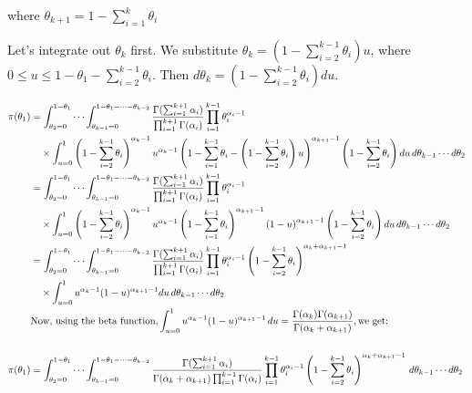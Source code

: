 \documentclass[a4paper]{article}
\begin{document}
where \(\theta_{k+1} = 1 - \sum_{i=1}^{k}\theta_i\)

Let's integrate out \(\theta_k\) first. We substitute \(\theta_k = (1 - \sum_{i=2}^{k-1} \theta_i)u\), where \(0 \leq u \leq 1 - \theta_1 - \sum_{i=2}^{k-1} \theta_i\). Then \(d\theta_k = (1 - \sum_{i=2}^{k-1} \theta_i) du\).

\begin{align*}
    \pi(\theta_1) &= \int_{\theta_2=0}^{1-\theta_1} \cdots \int_{\theta_{k-1}=0}^{1-\theta_1-\cdots-\theta_{k-2}} \frac{\Gamma(\sum_{i=1}^{k+1} \alpha_i)}{\prod_{i=1}^{k+1} \Gamma(\alpha_i)} \prod_{i=1}^{k-1} \theta_i^{\alpha_i - 1} \\
    & \quad \times \int_{u=0}^{1} \left(1 - \sum_{i=2}^{k-1} \theta_i \right)^{\alpha_k - 1} u^{\alpha_k - 1} \left(1 - \sum_{i=1}^{k-1} \theta_i - \left(1 - \sum_{i=2}^{k-1} \theta_i\right)u \right)^{\alpha_{k+1} - 1} \left(1 - \sum_{i=2}^{k-1} \theta_i \right) du\, d\theta_{k-1}\cdots d\theta_2 \\
    &= \int_{\theta_2=0}^{1-\theta_1} \cdots \int_{\theta_{k-1}=0}^{1-\theta_1-\cdots-\theta_{k-2}} \frac{\Gamma(\sum_{i=1}^{k+1} \alpha_i)}{\prod_{i=1}^{k+1} \Gamma(\alpha_i)} \prod_{i=1}^{k-1} \theta_i^{\alpha_i - 1} \\
    & \quad \times \int_{u=0}^{1} \left(1 - \sum_{i=2}^{k-1} \theta_i \right)^{\alpha_k - 1} u^{\alpha_k - 1} \left(1 - \sum_{i=1}^{k-1}\theta_i\right)^{\alpha_{k+1}-1}\left(1 - u\right)^{\alpha_{k+1} - 1} \left(1 - \sum_{i=2}^{k-1} \theta_i \right) du\, d\theta_{k-1}\cdots d\theta_2 \\
    &= \int_{\theta_2=0}^{1-\theta_1} \cdots \int_{\theta_{k-1}=0}^{1-\theta_1-\cdots-\theta_{k-2}} \frac{\Gamma(\sum_{i=1}^{k+1} \alpha_i)}{\prod_{i=1}^{k+1} \Gamma(\alpha_i)} \prod_{i=1}^{k-1} \theta_i^{\alpha_i - 1} \left(1 - \sum_{i=2}^{k-1} \theta_i \right)^{\alpha_k + \alpha_{k+1} - 1} \\
    & \quad \times \int_{u=0}^{1} u^{\alpha_k - 1} (1-u)^{\alpha_{k+1} - 1} du \, d\theta_{k-1} \cdots d\theta_2 \\
    &\text{Now, using the beta function,} \int_{u=0}^{1} u^{\alpha_k-1} (1-u)^{\alpha_{k+1}-1} \,du = \frac{\Gamma(\alpha_k)\Gamma(\alpha_{k+1})}{\Gamma(\alpha_k+\alpha_{k+1})}, \text{we get:}
    \\
    \vspace{5cm}
    \\
    \pi(\theta_1)&= \int_{\theta_2=0}^{1-\theta_1} \cdots \int_{\theta_{k-1}=0}^{1-\theta_1-\cdots-\theta_{k-2}} \frac{\Gamma(\sum_{i=1}^{k+1} \alpha_i)}{\Gamma(\alpha_k + \alpha_{k+1}) \prod_{i=1}^{k-1} \Gamma(\alpha_i)} \prod_{i=1}^{k-1} \theta_i^{\alpha_i - 1} \left(1 - \sum_{i=2}^{k-1} \theta_i \right)^{\alpha_k + \alpha_{k+1} - 1} \, d\theta_{k-1} \cdots d\theta_2 
\end{align*}
\end{document}
